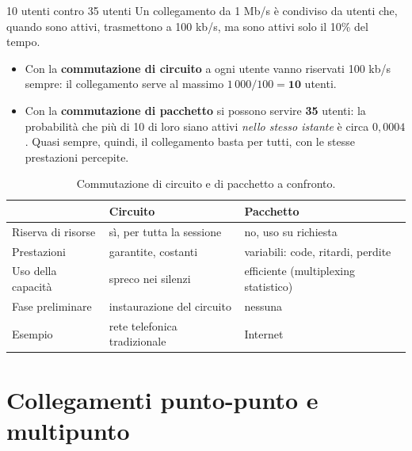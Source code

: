\begin{esempio}{10 utenti contro 35 utenti}
Un collegamento da 1 Mb/s è condiviso da utenti che, quando sono attivi, trasmettono a 100 kb/s,
ma sono attivi solo il 10\% del tempo.
\begin{itemize}
    \item Con la \textbf{commutazione di circuito} a ogni utente vanno riservati 100 kb/s sempre:
          il collegamento serve al massimo $1\,000/100 = \mathbf{10}$ utenti.
    \item Con la \textbf{commutazione di pacchetto} si possono servire \textbf{35} utenti: la probabilità
          che più di 10 di loro siano attivi \emph{nello stesso istante} è circa $0{,}0004$. Quasi sempre,
          quindi, il collegamento basta per tutti, con le stesse prestazioni percepite.
\end{itemize}
\end{esempio}

\begin{table}[H]
\centering
\begin{tabular}{p{3.3cm}p{5.5cm}p{5.5cm}}
\toprule
 & \textbf{Circuito} & \textbf{Pacchetto} \\
\midrule
Riserva di risorse & sì, per tutta la sessione & no, uso su richiesta \\
Prestazioni & garantite, costanti & variabili: code, ritardi, perdite \\
Uso della capacità & spreco nei silenzi & efficiente (multiplexing statistico) \\
Fase preliminare & instaurazione del circuito & nessuna \\
Esempio & rete telefonica tradizionale & Internet \\
\bottomrule
\end{tabular}
\caption{Commutazione di circuito e di pacchetto a confronto.}
\end{table}


\section{Collegamenti punto-punto e multipunto}

